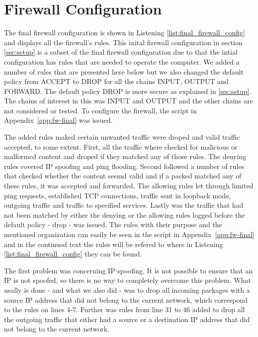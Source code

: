 \section{Firewall Configuration}
\label{sec:config}

The final firewall configuration is shown in Listening \ref{list:final_firewall_config} and displays all the firewall's rules. This inital firewall configuration in section \ref{sec:setup} is a subset of the final firewall configuration due to that the intial configuration has rules that are needed to operate the computer. We added a number of rules that are presented here below but we also changed the default policy from ACCEPT to DROP for all the chains INPUT, OUTPUT and FORWARD. The default policy DROP is more secure as explained in \ref{sec:setup}. The chains of interest in this \lab was INPUT and OUTPUT and the other chains are not considered or tested. To configure the firewall, the script in Appendix~\ref{app:fw-final} was issued.

The added rules maked certain unwanted traffic were droped and valid traffic accepted, to some extent. First, all the traffic where checked for malicious or malformed content and droped if they matched any of those rules. The denying rules covered IP spoofing and ping flooding. Second followed a number of rules that checked whether the content seemd valid and if a packed matched any of these rules, it was accepted and forwarded. The allowing rules let through limited ping requests, established TCP connections, traffic sent in loopback mode, outgoing traffic and traffic to specified services. Lastly was the traffic that had not been matched by either the denying or the allowing rules logged before the default policy - drop - was issued. The rules with their purpose and the mentioned organization can easily be seen in the script in Appendix~\ref{app:fw-final} and in the continued text the rules will be refered to where in Listening \ref{list:final_firewall_config} they can be found.

The first problem was concerning IP spoofing. It is not possible to ensure that an IP is not spoofed, so there is no way to completely overcome this problem. What usally is done - and what we also did - was to drop all incoming packages with a source IP address that did not belong to the current network, which correspond to the rules on lines 4-7. Further was rules from line 31 to 46 added to drop all the outgoing traffic that either had a source or a destination IP address that did not belong to the current network. 

